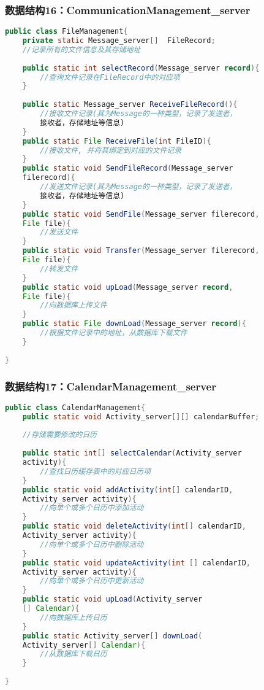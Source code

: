 \subsubsection{数据结构16：CommunicationManagement\_server}
\begin{lstlisting}[language=Java, caption=文件管理类]
public class FileManagement{
    private static Message_server[]  FileRecord; 
    //记录所有的文件信息及其存储地址
    
    public static int selectRecord(Message_server record){
        //查询文件记录在FileRecord中的对应项
    }
    
    public static Message_server ReceiveFileRecord(){
        //接收文件记录(其为Message的一种类型，记录了发送者，
        接收者，存储地址等信息)
    }
    public static File ReceiveFile(int FileID){
        //接收文件, 并将其绑定到对应的文件记录
    }
    public static void SendFileRecord(Message_server 
    filerecord){
        //发送文件记录(其为Message的一种类型，记录了发送者，
        接收者，存储地址等信息)
    }
    public static void SendFile(Message_server filerecord,
    File file){
        //发送文件
    }
    public static void Transfer(Message_server filerecord,
    File file){
        //转发文件
    }
    public static void upLoad(Message_server record, 
    File file){
        //向数据库上传文件
    }
    public static File downLoad(Message_server record){
        //根据文件记录中的地址，从数据库下载文件
    }
    
}
\end{lstlisting}
\subsubsection{数据结构17：CalendarManagement\_server}
\begin{lstlisting}[language=Java, caption=日历管理类]
public class CalendarManagement{
    public static void Activity_server[][] calendarBuffer;
    
    //存储需要修改的日历
    
    public static int[] selectCalendar(Activity_server
    activity){
        //查找日历缓存表中的对应日历项
    }
    public static void addActivity(int[] calendarID, 
    Activity_server activity){
        //向单个或多个日历中添加活动
    }
    public static void deleteActivity(int[] calendarID, 
    Activity_server activity){
        //向单个或多个日历中删除活动
    }
    public static void updateActivity(int [] calendarID, 
    Activity_server activity){
        //向单个或多个日历中更新活动
    }
    public static void upLoad(Activity_server
    [] Calendar){
        //向数据库上传日历
    }
    public static Activity_server[] downLoad(
    Activity_server[] Calendar){
        //从数据库下载日历
    }
    
}
\end{lstlisting}
